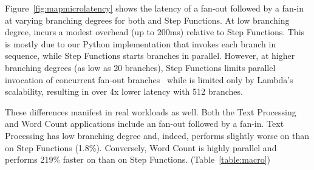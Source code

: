 Figure~\ref{fig:mapmicrolatency} shows the latency of a fan-out followed by a
fan-in at varying branching degrees for both \name{} and Step Functions. At
low branching degree, \name{} incurs a modest overhead (up to 200ms) relative
to Step Functions. This is mostly due to our Python implementation that
invokes each branch in sequence, while Step Functions starts branches in
parallel. However, at higher branching degrees (as low as 20 branches), Step
Functions limits parallel invocation of concurrent fan-out
branches~\cite{aws-step-functions-map-state} while \name{} is limited only by
Lambda's scalability, resulting in over 4x lower latency with 512 branches.

These differences manifest in real workloads as well. Both the Text Processing
and Word Count applications include an fan-out followed by a fan-in. Text
Processing has low branching degree and, indeed, performs slightly worse on
\name{} than on Step Functions (1.8\%). Conversely, Word Count is highly
parallel and performs 219\% faster on \name{} than on Step Functions. (Table~\ref{table:macro})






